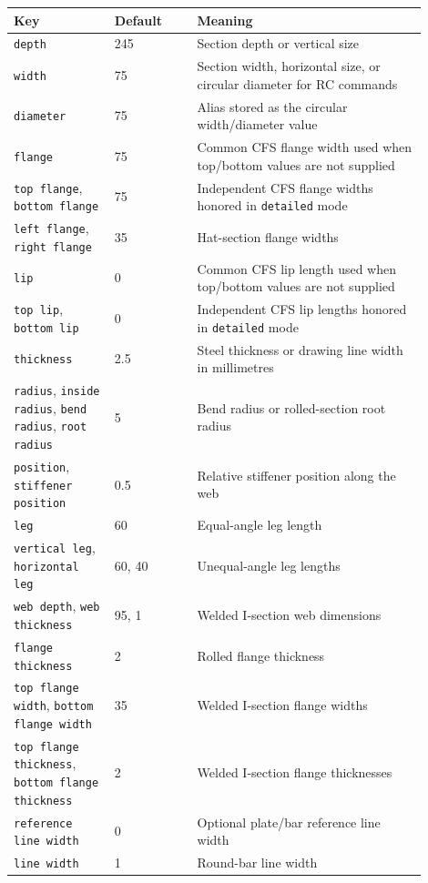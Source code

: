\documentclass[10pt]{article}
\newcommand{\keyname}[1]{\texttt{#1}}
\begin{document}
\begin{longtable}{p{0.22\linewidth}p{0.18\linewidth}p{0.50\linewidth}}
\toprule
Key & Default & Meaning \\
\midrule
\keyname{depth} & 245 & Section depth or vertical size \\
\keyname{width} & 75 & Section width, horizontal size, or circular diameter for RC commands \\
\keyname{diameter} & 75 & Alias stored as the circular width/diameter value \\
\keyname{flange} & 75 & Common CFS flange width used when top/bottom values are not supplied \\
\keyname{top flange}, \keyname{bottom flange} & 75 & Independent CFS flange widths honored in \keyname{detailed} mode \\
\keyname{left flange}, \keyname{right flange} & 35 & Hat-section flange widths \\
\keyname{lip} & 0 & Common CFS lip length used when top/bottom values are not supplied \\
\keyname{top lip}, \keyname{bottom lip} & 0 & Independent CFS lip lengths honored in \keyname{detailed} mode \\
\keyname{thickness} & 2.5 & Steel thickness or drawing line width in millimetres \\
\keyname{radius}, \keyname{inside radius}, \keyname{bend radius}, \keyname{root radius} & 5 & Bend radius or rolled-section root radius \\
\keyname{position}, \keyname{stiffener position} & 0.5 & Relative stiffener position along the web \\
\keyname{leg} & 60 & Equal-angle leg length \\
\keyname{vertical leg}, \keyname{horizontal leg} & 60, 40 & Unequal-angle leg lengths \\
\keyname{web depth}, \keyname{web thickness} & 95, 1 & Welded I-section web dimensions \\
\keyname{flange thickness} & 2 & Rolled flange thickness \\
\keyname{top flange width}, \keyname{bottom flange width} & 35 & Welded I-section flange widths \\
\keyname{top flange thickness}, \keyname{bottom flange thickness} & 2 & Welded I-section flange thicknesses \\
\keyname{reference line width} & 0 & Optional plate/bar reference line width \\
\keyname{line width} & 1 & Round-bar line width \\

\end{longtable}
\end{document}
